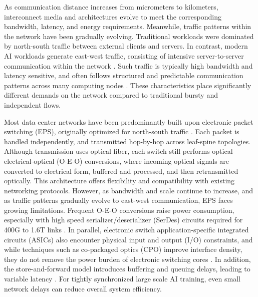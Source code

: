 As communication distance increases from micrometers to kilometers, interconnect media and architectures evolve to meet the corresponding bandwidth, latency, and energy requirements.
Meanwhile, traffic patterns within the network have been gradually evolving.
Traditional workloads were dominated by north-south traffic between external clients and servers.
In contrast, modern AI workloads generate east-west traffic, consisting of intensive server-to-server communication within the network \cite{Sbriglia2024AIDataCenter, nooruzzaman2021hyperscale}.
Such traffic is typically high bandwidth and latency sensitive, and often follows structured and predictable communication patterns across many computing nodes \cite{wangTopoopTCooptimizingNetwork, avin2025revolutionizing}.
These characteristics place significantly different demands on the network compared to traditional bursty and independent flows.

Most data center networks have been predominantly built upon electronic packet switching (EPS), originally optimized for north-south traffic \cite{1455410}.
Each packet is handled independently, and transmitted hop-by-hop across leaf-spine topologies.
Although transmission uses optical fiber, each switch still performs optical-electrical-optical (O-E-O) conversions, where incoming optical signals are converted to electrical form, buffered and processed, and then retransmitted optically.
This architecture offers flexibility and compatibility with existing networking protocols.
However, as bandwidth and scale continue to increase, and as traffic patterns gradually evolve to east-west communication, EPS faces growing limitations.
Frequent O-E-O conversions raise power consumption, especially with high speed serializer/deserializer (SerDes) circuits required for 400G to 1.6T links \cite{keysight_800g_16t}.
In parallel, electronic switch application-specific integrated circuits (ASICs) also encounter physical input and output (I/O) constraints, and while techniques such as co-packaged optics (CPO) improve interface density, they do not remove the power burden of electronic switching cores \cite{minkenberg2021co}.
In addition, the store-and-forward model introduces buffering and queuing delays, leading to variable latency \cite{1455410}.
For tightly synchronized large scale AI training, even small network delays can reduce overall system efficiency.

